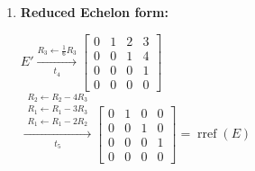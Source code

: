 \begin{enumerate}
    \item
    \textbf{Reduced Echelon form:} \\[1.0em]
    \begin{answer}
        $E' \xrightarrow[t_4]{R_3 \leftarrow \frac{1}{6}R_3}
        \begin{bmatrix}
            0 & 1 & 2 & 3 \\
            0 & 0 & 1 & 4 \\
            0 & 0 & 0 & 1 \\
            0 & 0 & 0 & 0
        \end{bmatrix}
        $ \\[1.0em]

        $\xrightarrow[t_5]{
            \substack{
                R_2 \leftarrow R_2-4R_3 \\
                R_1 \leftarrow R_1-3R_3 \\
                R_1 \leftarrow R_1-2R_2
            }
        }
        \begin{bmatrix}
            0 & 1 & 0 & 0 \\
            0 & 0 & 1 & 0 \\
            0 & 0 & 0 & 1 \\
            0 & 0 & 0 & 0
        \end{bmatrix}
        = \operatorname{rref}(E)$
    \end{answer}
\end{enumerate}
